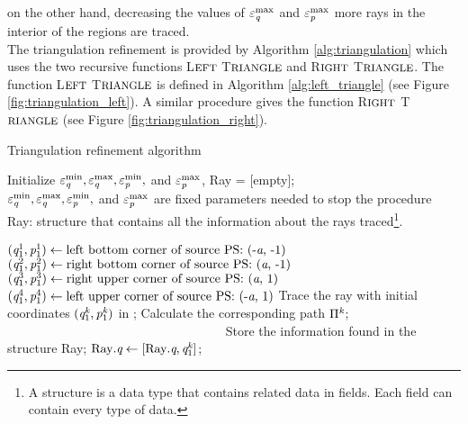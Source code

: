 on the other hand, decreasing the values of $\varepsilon_{\textit{q}}^\textrm{max}$ and $\varepsilon_{\textit{p}}^\textrm{max}$ more rays in the interior of the regions are traced. \\ \indent The triangulation refinement is provided by Algorithm \ref{alg:triangulation} which uses the two recursive functions L$\footnotesize{\textrm{EFT}}$ T$\footnotesize{\textrm{RIANGLE}}$ and  R$\footnotesize{\textrm{IGHT}}$ T$\footnotesize{\textrm{RIANGLE}}$.
The function L$\footnotesize{\textrm{EFT}}$ T$\footnotesize{\textrm{RIANGLE}}$ is defined in Algorithm \ref{alg:left_triangle} (see Figure \ref{fig:triangulation_left}). 
A similar procedure gives the function R$\footnotesize{\textrm{IGHT}}$ T$\footnotesize{\textrm{RIANGLE}}$ (see Figure \ref{fig:triangulation_right}).
\begin{algorithm}[h]
\caption{Triangulation refinement algorithm}\label{alg:triangulation}
Initialize $\varepsilon_{\textit{q}}^{\textrm{min}}, \varepsilon_{\textit{q}}^{\textrm{max}}, \varepsilon_{\textit{p}}^{\textrm{min}},$ and
 $\varepsilon_{\textit{p}}^{\textrm{max}}$, Ray = [empty];\\
\Comment $\varepsilon_{\textit{q}}^{\textrm{min}}, \varepsilon_{\textit{q}}^{\textrm{max}}, \varepsilon_{\textit{p}}^{\textrm{min}},$ and
 $\varepsilon_{\textit{p}}^{\textrm{max}}$ are fixed parameters needed to stop the procedure\\
\Comment Ray: structure that contains all the information about the rays traced\footnote{A structure is a data type that contains related data in fields. Each field can contain every type of data.}.
\begin{algorithmic}[1]
\State $(\textit{q}_1^1, \textit{p}_1^1)\gets \mbox{left bottom corner of source PS: (-\textit{a}, -1)}$
\State $(\textit{q}_1^2, \textit{p}_1^2) \gets \mbox{right bottom corner of source PS:  (\textit{a}, -1)}$
\State $(\textit{q}_1^3, \textit{p}_1^3)  \gets \mbox{right upper corner of source PS: (\textit{a}, 1)}$
\State $(\textit{q}_1^4, \textit{p}_1^4) \gets \mbox{left upper corner of source PS: (-\textit{a}, 1)} $
\State Trace the ray with initial coordinates $(\textit{q}_1^{\textit{k}}, \textit{p}_1^{\textit{k}})$ in ;
\State Calculate the corresponding path $\Pi^{\textit{k}}$; $\qquad \qquad \qquad \qquad \qquad \qquad \qquad \qquad\quad$
\Comment Store the information found in the structure Ray;
\State $\textrm{Ray}.\textit{q}\gets [\mbox{Ray}.\textit{q}, \textit{q}_1^{\textit{k}}]$;

\end{algorithmic}
\end{algorithm}
